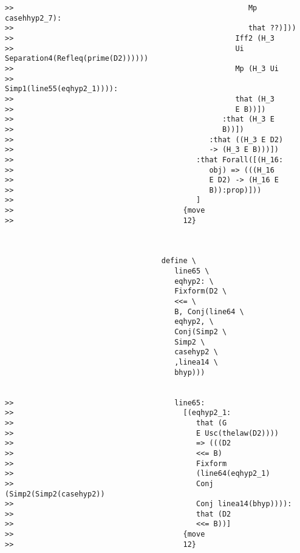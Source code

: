 \documentclass[12pt]{article}
\begin{document}
\begin{verbatim}
>>                                                      Mp casehhyp2_7):
>>                                                      that ??)]))
>>                                                   Iff2 (H_3
>>                                                   Ui Separation4(Refleq(prime(D2))))))
>>                                                   Mp (H_3 Ui
>>                                                   Simp1(line55(eqhyp2_1)))):
>>                                                   that (H_3
>>                                                   E B))])
>>                                                :that (H_3 E
>>                                                B))])
>>                                             :that ((H_3 E D2)
>>                                             -> (H_3 E B)))])
>>                                          :that Forall([(H_16:
>>                                             obj) => (((H_16
>>                                             E D2) -> (H_16 E
>>                                             B)):prop)]))
>>                                          ]
>>                                       {move
>>                                       12}



                                    define \
                                       line65 \
                                       eqhyp2: \
                                       Fixform(D2 \
                                       <<= \
                                       B, Conj(line64 \
                                       eqhyp2, \
                                       Conj(Simp2 \
                                       Simp2 \
                                       casehyp2 \
                                       ,linea14 \
                                       bhyp)))


>>                                     line65:
>>                                       [(eqhyp2_1:
>>                                          that (G
>>                                          E Usc(thelaw(D2))))
>>                                          => (((D2
>>                                          <<= B)
>>                                          Fixform
>>                                          (line64(eqhyp2_1)
>>                                          Conj (Simp2(Simp2(casehyp2))
>>                                          Conj linea14(bhyp)))):
>>                                          that (D2
>>                                          <<= B))]
>>                                       {move
>>                                       12}




\end{verbatim}
\end{document}
